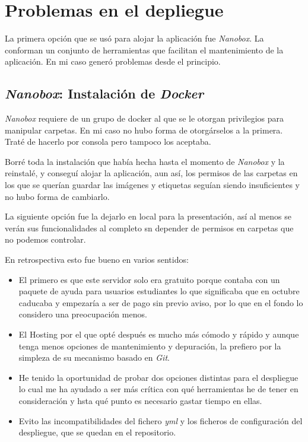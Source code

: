\section{Problemas en el depliegue}

La primera opción que se usó para alojar la aplicación fue  \textit{Nanobox}. La conforman un conjunto de herramientas que facilitan el mantenimiento de la aplicación. En mi caso generó problemas desde el principio.

\subsection{\textit{Nanobox}: Instalación de \textit{Docker}}
\textit{Nanobox} requiere de un grupo de docker al que se le otorgan privilegios para manipular carpetas. En mi caso no hubo forma de otorgárselos a la primera. Traté de hacerlo por consola pero tampoco los aceptaba.

Borré toda la instalación que había hecha hasta el momento de \textit{Nanobox} y la reinstalé, y conseguí alojar la aplicación, aun así, los permisos de las carpetas en los que se querían guardar las imágenes y etiquetas seguían siendo insuficientes y no hubo forma de cambiarlo.

La siguiente opción fue la dejarlo en local para la presentación, así al menos se verán sus funcionalidades al completo sn depender de permisos en carpetas que no podemos controlar.

En retrospectiva esto fue bueno en varios sentidos:

\begin{itemize}
	\item El primero es que este servidor solo era gratuito porque contaba con un paquete de ayuda para usuarios estudiantes lo que significaba que en octubre caducaba y empezaría a ser de pago sin previo aviso, por lo que en el fondo lo considero una preocupación menos.
	
	\item El Hosting por el que opté después es mucho más cómodo y rápido y aunque tenga menos opciones de mantenimiento y depuración, la prefiero por la simpleza de su mecanismo basado en \textit{Git}.
	
	\item He tenido la oportunidad de probar dos opciones distintas para el despliegue lo cual me ha ayudado a ser más crítica con qué herramientas he de tener en consideración y hsta qué punto es necesario gastar tiempo en ellas.
	
	\item Evito las incompatibilidades del fichero  \textit{yml} y los ficheros de configuración del despliegue, que se quedan en el repositorio. 
\end{itemize}

